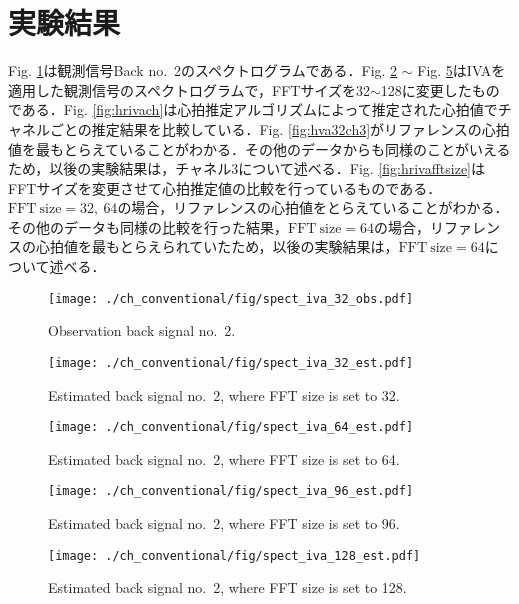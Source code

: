 \section{実験結果}
\label{sec:conv:expresult4}
Fig. \ref{fig:siva32obs}は観測信号Back no.~2のスペクトログラムである．Fig. \ref{fig:siva32est} $\sim$ Fig. \ref{fig:siva128est}はIVAを適用した観測信号のスペクトログラムで，FFTサイズを32$\sim$128に変更したものである．Fig. \ref{fig:hrivach}は心拍推定アルゴリズムによって推定された心拍値でチャネルごとの推定結果を比較している．Fig. \ref{fig:hva32ch3}がリファレンスの心拍値を最もとらえていることがわかる．その他のデータからも同様のことがいえるため，以後の実験結果は，チャネル3について述べる．Fig. \ref{fig:hrivafftsize}はFFTサイズを変更させて心拍推定値の比較を行っているものである．$\mathrm{FFT~size}=32,~64$の場合，リファレンスの心拍値をとらえていることがわかる．その他のデータも同様の比較を行った結果，$\mathrm{FFT~size}=64$の場合，リファレンスの心拍値を最もとらえられていたため，以後の実験結果は，$\mathrm{FFT~size}=64$について述べる．

\begin{figure}[tb]
\centering
\texttt{[image: ./ch\_conventional/fig/spect\_iva\_32\_obs.pdf]}
\caption{Observation back signal no.~2.}
\label{fig:siva32obs}
\end{figure}

\begin{figure}[tb]
\centering
\texttt{[image: ./ch\_conventional/fig/spect\_iva\_32\_est.pdf]}
\caption{Estimated back signal no.~2, where FFT size is set to 32.}
\label{fig:siva32est}
\end{figure}

\begin{figure}[tb]
\centering
\texttt{[image: ./ch\_conventional/fig/spect\_iva\_64\_est.pdf]}
\caption{Estimated back signal no.~2, where FFT size is set to 64.}
\label{fig:siva64est}
\end{figure}

\begin{figure}[tb]
\centering
\texttt{[image: ./ch\_conventional/fig/spect\_iva\_96\_est.pdf]}
\caption{Estimated back signal no.~2, where FFT size is set to 96.}
\label{fig:siva96est}
\end{figure}

\begin{figure}[tb]
\centering
\texttt{[image: ./ch\_conventional/fig/spect\_iva\_128\_est.pdf]}
\caption{Estimated back signal no.~2, where FFT size is set to 128.}
\label{fig:siva128est}
\end{figure}


